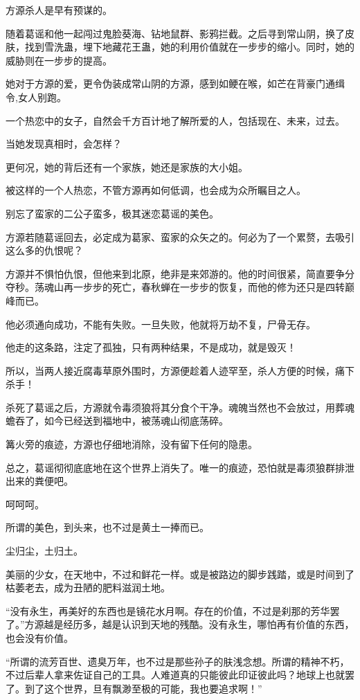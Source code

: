 \begin{this_body}
方源杀人是早有预谋的。

随着葛谣和他一起闯过鬼脸葵海、钻地鼠群、影鸦拦截。之后寻到常山阴，换了皮肤，找到雪洗蛊，埋下地藏花王蛊，她的利用价值就在一步步的缩小。同时，她的威胁则在一步步的提高。

她对于方源的爱，更令伪装成常山阴的方源，感到如鲠在喉，如芒在背豪门通缉令,女人别跑。

一个热恋中的女子，自然会千方百计地了解所爱的人，包括现在、未来，过去。

当她发现真相时，会怎样？

更何况，她的背后还有一个家族，她还是家族的大小姐。

被这样的一个人热恋，不管方源再如何低调，也会成为众所瞩目之人。

别忘了蛮家的二公子蛮多，极其迷恋葛谣的美色。

方源若随葛谣回去，必定成为葛家、蛮家的众矢之的。何必为了一个累赘，去吸引这么多的仇恨呢？

方源并不惧怕仇恨，但他来到北原，绝非是来郊游的。他的时间很紧，简直要争分夺秒。荡魂山再一步步的死亡，春秋蝉在一步步的恢复，而他的修为还只是四转巅峰而已。

他必须通向成功，不能有失败。一旦失败，他就将万劫不复，尸骨无存。

他走的这条路，注定了孤独，只有两种结果，不是成功，就是毁灭！

所以，当两人接近腐毒草原外围时，方源便趁着人迹罕至，杀人方便的时候，痛下杀手！

杀死了葛谣之后，方源就令毒须狼将其分食个干净。魂魄当然也不会放过，用葬魂蟾吞了，如今已经送到福地中，被荡魂山彻底荡碎。

篝火旁的痕迹，方源也仔细地消除，没有留下任何的隐患。

总之，葛谣彻彻底底地在这个世界上消失了。唯一的痕迹，恐怕就是毒须狼群排泄出来的粪便吧。

呵呵呵。

所谓的美色，到头来，也不过是黄土一捧而已。

尘归尘，土归土。

美丽的少女，在天地中，不过和鲜花一样。或是被路边的脚步践踏，或是时间到了枯萎老去，成为丑陋的肥料滋润土地。

“没有永生，再美好的东西也是镜花水月啊。存在的价值，不过是刹那的芳华罢了。”方源越是经历多，越是认识到天地的残酷。没有永生，哪怕再有价值的东西，也会没有价值。

“所谓的流芳百世、遗臭万年，也不过是那些孙子的肤浅念想。所谓的精神不朽，不过后辈人拿来佐证自己的工具。人难道真的只能彼此印证彼此吗？地球上也就罢了。到了这个世界，旦有飘渺至极的可能，我也要追求啊！”


\end{this_body}
